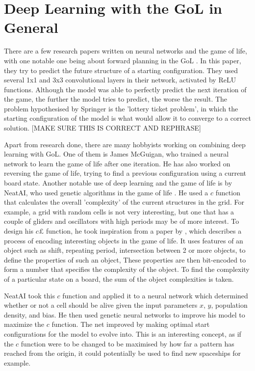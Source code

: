 \documentclass{l4proj}
\begin{document}
\section{Deep Learning with the GoL in General}

There are a few research papers written on neural networks and the game of life, with one notable one being about forward planning in the GoL \cite{game_of_life_dl_is_hard}. In this paper, they try to predict the future structure of a starting configuration. They used several 1x1 and 3x3 convolutional layers in their network, activated by ReLU functions. Although the model was able to perfectly predict the next iteration of the game, the further the model tries to predict, the worse the result. The problem hypothesised by Springer is the 'lottery ticket problem', in which the starting configuration of the model is what would allow it to converge to a correct solution. [MAKE SURE THIS IS CORRECT AND REPHRASE]

Apart from research done, there are many hobbyists working on combining deep learning with GoL. One of them is James McGuigan, who trained a neural network to learn the game of life after one iteration. He has also worked on reversing the game of life, trying to find a previous configuration using a current board state. Another notable use of deep learning and the game of life is by NeatAI, who used genetic algorithms in the game of life \cite{neatai_gol}. He used a $c$ function that calculates the overall 'complexity' of the current structures in the grid. For example, a grid with random cells is not very interesting, but one that has a couple of gliders and oscillators with high periods may be of more interest. To design his $c£$ function, he took inspiration from a paper by \cite{algorithmic_specified_complexity}, which describes a process of encoding interesting objects in the game of life. It uses features of an object such as shift, repeating period, intersection between 2 or more objects, to define the properties of such an object, These properties are then bit-encoded to form a number that specifies the complexity of the object. To find the complexity of a particular state on a board, the sum of the object complexities is taken.

NeatAI took this $c$ function and applied it to a neural network which determined whether or not a cell should be alive given the input parameters $x$, $y$, population density, and bias. He then used genetic neural networks to improve his model to maximize the $c$ function. The net improved by making optimal start configurations for the model to evolve into. This is an interesting concept, as if the $c$ function were to be changed to be maximised by how far a pattern has reached from the origin, it could potentially be used to find new spaceships for example.
\end{document}
